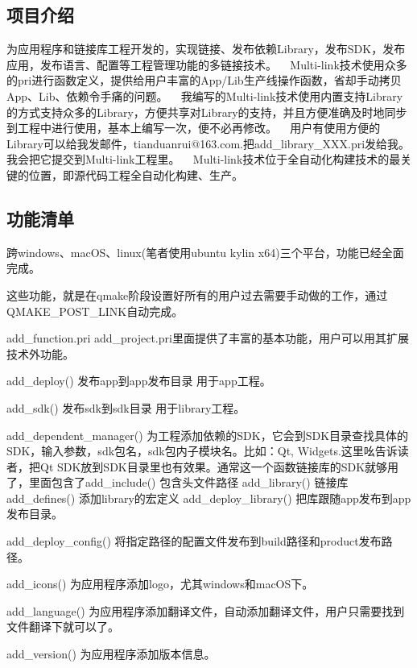 \subsection*{项目介绍}

为应用程序和链接库工程开发的，实现链接、发布依赖\+Library，发布\+S\+D\+K，发布应用，发布语言、配置等工程管理功能的多链接技术。 ~\newline
Multi-\/link技术使用众多的pri进行函数定义，提供给用户丰富的\+App/\+Lib生产线操作函数，省却手动拷贝\+App、\+Lib、依赖令手痛的问题。 ~\newline
我编写的\+Multi-\/link技术使用内置支持\+Library的方式支持众多的\+Library，方便共享对\+Library的支持，并且方便准确及时地同步到工程中进行使用，基本上编写一次，便不必再修改。 ~\newline
用户有使用方便的\+Library可以给我发邮件，tianduanrui@163.\+com.把add\+\_\+library\+\_\+\+X\+X\+X.\+pri发给我。我会把它提交到\+Multi-\/link工程里。 ~\newline
Multi-\/link技术位于全自动化构建技术的最关键的位置，即源代码工程全自动化构建、生产。

\subsection*{功能清单}


\begin{DoxyEnumerate}
\item 跨windows、mac\+O\+S、linux(笔者使用ubuntu kylin x64)三个平台，功能已经全面完成。
\item 这些功能，就是在qmake阶段设置好所有的用户过去需要手动做的工作，通过\+Q\+M\+A\+K\+E\+\_\+\+P\+O\+S\+T\+\_\+\+L\+I\+N\+K自动完成。
\item add\+\_\+function.\+pri add\+\_\+project.\+pri里面提供了丰富的基本功能，用户可以用其扩展技术外功能。
\item add\+\_\+deploy() 发布app到app发布目录 用于app工程。
\item add\+\_\+sdk() 发布sdk到sdk目录 用于library工程。
\item add\+\_\+dependent\+\_\+manager() 为工程添加依赖的\+S\+D\+K，它会到\+S\+D\+K目录查找具体的\+S\+D\+K，输入参数，sdk包名，sdk包内子模块名。比如：\+Qt, Widgets.\+这里吆告诉读者，把\+Qt S\+D\+K放到\+S\+D\+K目录里也有效果。通常这一个函数链接库的\+S\+D\+K就够用了，里面包含了add\+\_\+include() 包含头文件路径 add\+\_\+library() 链接库 add\+\_\+defines() 添加library的宏定义 add\+\_\+deploy\+\_\+library() 把库跟随app发布到app发布目录。
\item add\+\_\+deploy\+\_\+config() 将指定路径的配置文件发布到build路径和product发布路径。
\item add\+\_\+icons() 为应用程序添加logo，尤其windows和mac\+O\+S下。
\item add\+\_\+language() 为应用程序添加翻译文件，自动添加翻译文件，用户只需要找到文件翻译下就可以了。
\end{DoxyEnumerate}
\begin{DoxyEnumerate}
\item add\+\_\+version() 为应用程序添加版本信息。
\end{DoxyEnumerate}

